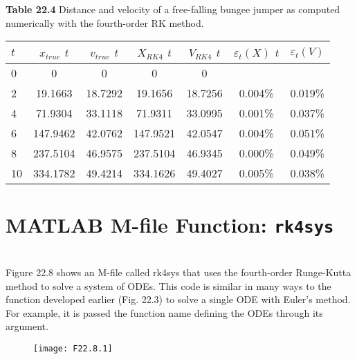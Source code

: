 \vspace{0,3in}
\textbf{Table 22.4} Distance and velocity of a free-falling bungee jumper as computed
numerically with the fourth-order RK method.
\\
\begin{tabular}{lcccccc}
\hline

	\textbf{$t$} \; \; \; \; \; & \textbf{$x_{true}$} 
	\textbf{$t$} \; \; \; \; \; & \textbf{$v_{true}$} 
	\textbf{$t$} \; \; \; \; \; & \textbf{$X_{RK4}$} 
	\textbf{$t$} \; \; \; \; \; & \textbf{$V_{RK4}$} 
	\textbf{$t$} \; \; \; \; \; & \textbf{$\varepsilon_{t}(X)$} 
	\textbf{$t$} \; \; \; \; \; & \textbf{$\varepsilon_{t}(V)$}\\
	
\hline

	0 & 0 & 0 & 0 & 0 & \vspace{} & \vspace{}\\

	2 & 19.1663 & 18.7292 & 19.1656 & 18.7256 & 0.004\% & 0.019\%\\

	4 & 71.9304 & 33.1118 & 71.9311 & 33.0995 & 0.001\% & 0.037\%\\

	6 & 147.9462 & 42.0762 & 147.9521 & 42.0547 & 0.004\% & 0.051\%\\

	8 & 237.5104 & 46.9575 & 237.5104 & 46.9345 & 0.000\% & 0.049\%\\

	10 & 334.1782 & 49.4214 & 334.1626 & 49.4027 & 0.005\% & 0.038\%\\


\hline
\end{tabular}

\section{MATLAB M-file Function: \texttt{rk4sys}}
\\
Figure 22.8 shows an M-file called rk4sys that uses the fourth-order Runge-Kutta method
to solve a system of ODEs. This code is similar in many ways to the function developed
earlier (Fig. 22.3) to solve a single ODE with Euler’s method. For example, it is passed the
function name defining the ODEs through its argument.
\pagebreak
\begin{figure}[hbt!]
	\texttt{[image: F22.8.1]}
	\label{F22.8.1}
\end{figure}\\

